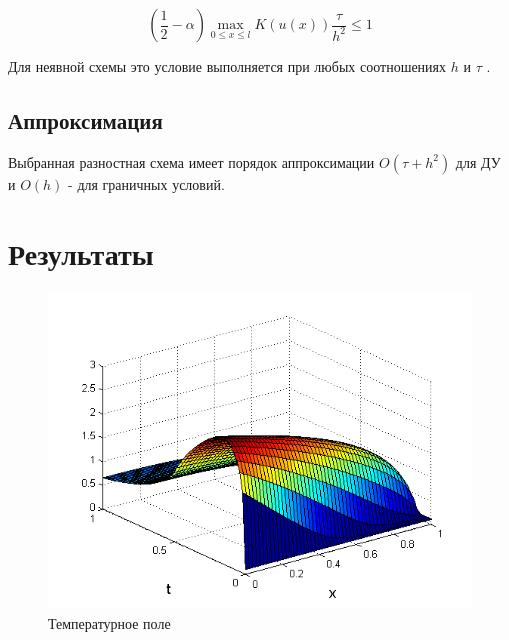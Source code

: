 \documentclass[titlepage,12pt]{article}
\begin{document}
\begin{equation}
(\frac{1}{2} - \alpha)\max_{0\le x \le l}K(u(x))\frac{\tau}{h^2} \le 1
\end{equation}
 
Для неявной схемы это условие выполняется при любых соотношениях $h$  и $\tau$ .

\subsection{Аппроксимация}
Выбранная разностная схема имеет порядок аппроксимации $O(\tau + h^2)$ для ДУ и $O(h)$  - для граничных условий.

\newpage
\section{Результаты}

\begin{figure}[h]
\centering
\includegraphics[width = 16cm]{Screen.png}
\caption{Температурное поле}
\label{fig:16}	
\end{figure}
\end{document}
